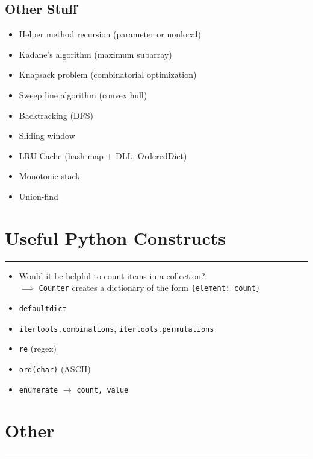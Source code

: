 \documentclass[12pt]{article}
\begin{document}
\subsection*{Other Stuff}

\begin{itemize}
  \item Helper method recursion (parameter or nonlocal)
  \item Kadane's algorithm (maximum subarray)
  \item Knapsack problem (combinatorial optimization)
  \item Sweep line algorithm (convex hull)
  \item Backtracking (DFS)
  \item Sliding window
  \item LRU Cache (hash map + DLL, OrderedDict)
  \item Monotonic stack
  \item Union-find
\end{itemize}

\section*{Useful Python Constructs}
\hrule\vspace{5ex}

\begin{itemize}
  \item Would it be helpful to count items in a collection? \\
    \-\hspace{1em} $\implies$ \texttt{Counter} creates a dictionary of the form \texttt{\{element: count\}}
  \item \texttt{defaultdict}
  \item \texttt{itertools.combinations}, \texttt{itertools.permutations}
  \item \texttt{re} (regex)
  \item \texttt{ord(char)} (ASCII)
  \item \texttt{enumerate} $\rightarrow$ \texttt{count, value}
\end{itemize}

\section*{Other}
\hrule\vspace{5ex}
\end{document}
